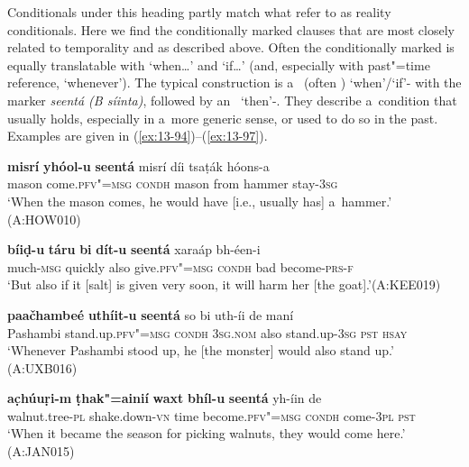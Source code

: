  Conditionals under this heading partly match what \citet[255--256]{thompsonetal2007} refer to as reality conditionals. Here we find the conditionally marked clauses that are most closely related to temporality and  as described above. Often the conditionally marked  is equally translatable with `when{\ldots}' and `if{\ldots}' (and, especially with past"=time reference, `whenever'). The typical construction is a~ (often ) `when'/`if'- with the  marker \textit{seentá (B síinta)}, followed by an~ `then'-. They describe a~condition that usually holds, especially in a~more generic sense, or used to do so in the past. Examples are given in (\ref{ex:13-94})--(\ref{ex:13-97}).

\begin{exe}
\ex
\label{ex:13-94}
\gll \textbf{misrí} \textbf{yhóol-u} \textbf{seentá} misrí díi tsaṭák hóons-a \\
mason come.\textsc{pfv"=msg} \textsc{condh} mason from hammer stay-\textsc{3sg}  \\
\glt `When the mason comes, he would have [i.e., usually has] a~hammer.' (A:HOW010)

\ex
\label{ex:13-95}
\gll \textbf{bíiḍ-u} \textbf{táru} \textbf{bi} \textbf{dít-u} \textbf{seentá} xaraáp  bh-éen-i \\
much-\textsc{msg} quickly also give.\textsc{pfv"=msg} \textsc{condh} bad  become-\textsc{prs-f}   \\
\glt `But also if it [salt] is given very soon, it will harm her [the goat].'\newline (A:KEE019)

\ex
\label{ex:13-96}
\gll \textbf{paačhambeé} \textbf{uthíit-u} \textbf{seentá} so bi  uth-íi de maní \\
Pashambi stand.up.\textsc{pfv"=msg} \textsc{condh} \textsc{3sg.nom} also stand.up-\textsc{3sg} \textsc{pst} \textsc{hsay}  \\
\glt `Whenever Pashambi stood up, he [the monster] would also stand up.' (A:UXB016)

\ex
\label{ex:13-97}
\gll \textbf{ac̣húuṛi-m} \textbf{ṭhak"=ainií} \textbf{waxt} \textbf{bhíl-u} \textbf{seentá}  yh-íin de \\
walnut.tree-\textsc{pl} shake.down-\textsc{vn} time become.\textsc{pfv"=msg} \textsc{condh} come-\textsc{3pl} \textsc{ pst}    \\
\glt `When it became the season for picking walnuts, they would come here.' (A:JAN015) 
\end{exe}

